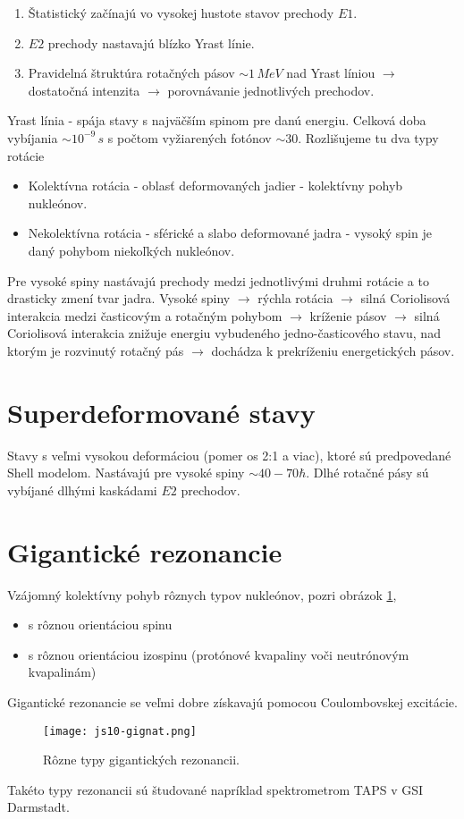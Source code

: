 \documentclass[../../main.tex]{subfiles}
\begin{document}
\begin{enumerate}
	\item Štatistický začínajú vo vysokej hustote stavov prechody $E1$.
	\item $E2$ prechody nastavajú blízko Yrast línie.
	\item Pravidelná štruktúra rotačných pásov $\sim 1\,MeV$ nad Yrast líniou $\rightarrow$ dostatočná intenzita $\rightarrow$ porovnávanie jednotlivých prechodov.
\end{enumerate}
Yrast línia - spája stavy s najväčším spinom pre danú energiu. Celková doba vybíjania $\sim 10^{-9}\,s$ s počtom vyžiarených fotónov $\sim 30$. Rozlišujeme tu dva typy rotácie 
\begin{itemize}
	\item Kolektívna rotácia - oblasť deformovaných jadier - kolektívny pohyb nukleónov.
	\item Nekolektívna rotácia - sférické a slabo deformované jadra - vysoký spin je daný pohybom niekoľkých nukleónov.
\end{itemize}
Pre vysoké spiny nastávajú prechody medzi jednotlivými druhmi rotácie a to drasticky zmení tvar jadra. Vysoké spiny $\rightarrow$ rýchla rotácia $\rightarrow$ silná Coriolisová interakcia medzi časticovým a rotačným pohybom $\rightarrow$ kríženie pásov $\rightarrow$ silná Coriolisová interakcia znižuje energiu vybudeného jedno-časticového stavu, nad ktorým je rozvinutý rotačný pás $\rightarrow$ dochádza k prekríženiu energetických pásov.
\section{Superdeformované stavy}
Stavy s veľmi vysokou deformáciou (pomer os 2:1 a viac), ktoré sú predpovedané Shell modelom. Nastávajú pre vysoké spiny $\sim 40-70 \hbar$. Dlhé rotačné pásy sú vybíjané dlhými kaskádami $E2$ prechodov.
\section{Gigantické rezonancie}
Vzájomný kolektívny pohyb rôznych typov nukleónov, pozri obrázok \ref{js10:gigant},
\begin{itemize}
	\item s rôznou orientáciou spinu
	\item s rôznou orientáciou izospinu (protónové kvapaliny voči neutrónovým kvapalinám)
\end{itemize}
Gigantické rezonancie se veľmi dobre získavajú pomocou Coulombovskej excitácie.
\begin{figure}[!h]
\centerline{\texttt{[image: js10-gignat.png]}}
\caption{Rôzne typy gigantických rezonancii.}
\label{js10:gigant}
\end{figure}
Takéto typy rezonancii sú študované napríklad spektrometrom TAPS v GSI Darmstadt.
\end{document}
